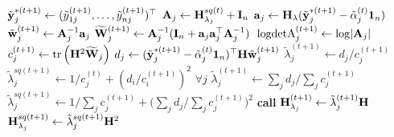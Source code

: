 \begin{algorithm}[H]
\begin{algorithmic}[1]
    \State $\tilde{{\mathbf y}}_j^{*(t+1)} \gets (\tilde y_{1j}^{(t+1)}, \dots, \tilde y_{nj}^{(t+1)})^\top$
    \State ${\mathbf A}_j \gets {\mathbf H}_{\lambda_j}^{sq(t)} + {\mathbf I}_{n}$ \vspace{0.8mm}
    \State ${\mathbf a}_j \gets {\mathbf H}_\lambda(\tilde{{\mathbf y}}_j^{*(t+1)} - \tilde\alpha_j^{(t)}{\mathbf 1}_{n})$
    \State $\tilde{{\mathbf w}}_j^{(t+1)} \gets {\mathbf A}_j^{-1}{\mathbf a}_j$
    \State ${\widetilde{{\mathbf W}}}_j^{(t+1)} \gets {\mathbf A}_j^{-1}({\mathbf I}_{n} + {\mathbf a}_j{\mathbf a}_j^\top{\mathbf A}_j^{-1})$\
    \State $\text{logdetA}_j^{(t+1)} \gets \log \lvert{\mathbf A}_j\rvert$
  \EndFor
\EndProcedure
\Statex
{}
    \State $c_j^{(t+1)} \gets \operatorname{tr} \left(  {\mathbf H}^2 {\widetilde{{\mathbf W}}}_j \right) $
    \State $d_j \gets (\tilde{{\mathbf y}}_j^{*(t+1)} - \tilde\alpha_j^{(t)}{\mathbf 1}_{n})^\top {\mathbf H} \tilde{{\mathbf w}}_j^{(t+1)}$
    \State $\tilde\lambda_j^{(t+1)} \gets d_j / c_j^{(t+1)}$
    \State $\tilde\lambda_j^{sq(t+1)} \gets 1/c_j^{(t)} + (d_i / c_i^{(t+1)})^2$          
  \EndFor
     $\forall j$
      \State $\tilde\lambda_j^{(t+1)} \gets \sum_j d_j \Big/ \sum_j c_j^{(t+1)}$
      \State $\tilde\lambda_j^{sq(t+1)} \gets 1 \Big/ \sum_j c_j^{(t+1)} + \Big( \sum_j d_j \Big/ \sum_j c_j^{(t+1)} \Big)^2$  
  \EndIf
  \State \textbf{call} 
\EndProcedure
\Statex
{}
    \State ${\mathbf H}_{\lambda_j}^{(t+1)} \gets \tilde\lambda_j^{(t+1)}{\mathbf H}$  
    \State ${\mathbf H}_{\lambda_j}^{sq(t+1)} \gets \tilde\lambda_j^{sq(t+1)}{\mathbf H}^2$     
  \EndFor
\EndProcedure
{}	
\end{algorithmic}
\end{algorithm}


